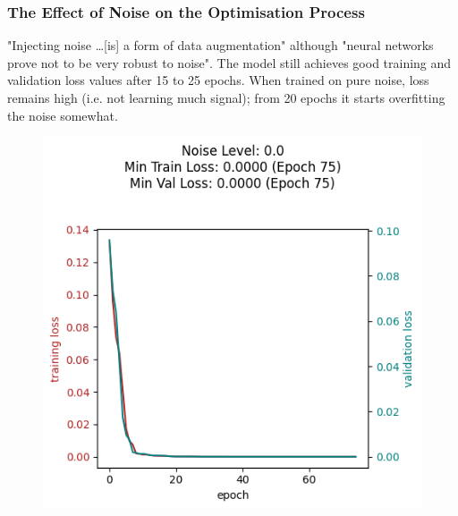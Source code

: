 \subsubsection{The Effect of Noise on the Optimisation Process}

"Injecting noise \dots [is] a form of data augmentation" \citep{SIETSMA199167,Goodfellowetal2016}
although "neural networks prove not to be very robust to noise". \citep{TangE10,Goodfellowetal2016}
The model still achieves good training and validation loss values after 15 to 25 epochs.
When trained on pure noise, loss remains high (i.e. not learning much signal); from 20 epochs it starts overfitting the noise somewhat.

\begin{figure}[h!]
    \begin{minipage}[t]{0.32\textwidth}
        \includegraphics[width=\textwidth]{figures/noise-level-0-0.png}
        \label{fig:noise-level-0-0}
    \end{minipage}
    \begin{minipage}[t]{0.32\textwidth}

\end{minipage}
\end{figure}
